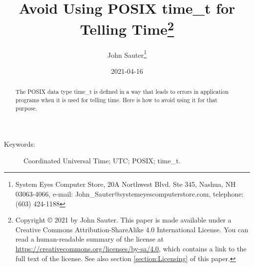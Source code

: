 \documentclass[letterpaper,twoside]{article}
\begin{document}
\title{Avoid Using POSIX {\ttfamily time\_t} for Telling
  Time\footnote{Copyright
    {\copyright} 2021 by John Sauter.
    This paper is made available under a
    Creative Commons Attribution-ShareAlike 4.0 International License.
    You can read a human-readable summary of the license at
    \url{https://creativecommons.org/licenses/by-sa/4.0}, which contains
    a link to the full text of the license.
    See also section \ref{section:Licensing} of this paper.}
}
\author{John Sauter\footnote{
    System Eyes Computer Store,
    20A Northwest Blvd.  Ste 345,
    Nashua, NH  03063-4066,
    e-mail: John\_Sauter@systemeyescomputerstore.com,
    telephone: (603) 424-1188}}
\date{2021-04-16}
\maketitle
\begin{abstract}
  The POSIX data type {\ttfamily time\_t} is defined in a way that leads
  to errors in application programs when it is used for telling time.
  Here is how to avoid using it for that purpose.
\end{abstract}
\begin{description}
\item[Keywords:]Coordinated Universal Time; UTC; POSIX; time\_t.
\end{description}
  
\end{document}
